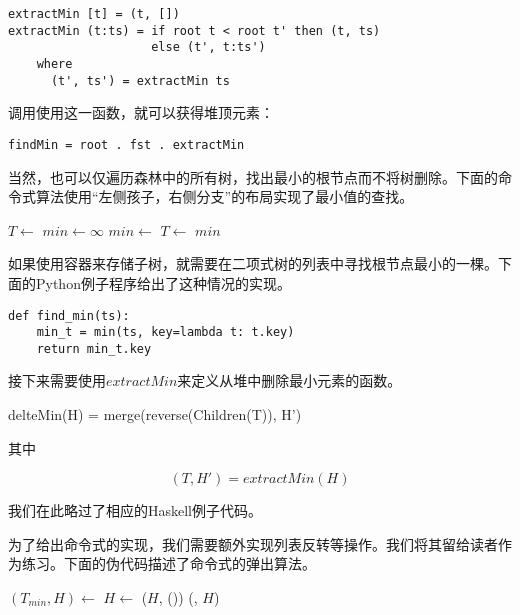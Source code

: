 \documentclass[UTF8]{article}
\begin{document}
\lstset{language=Haskell}
\begin{lstlisting}
extractMin [t] = (t, [])
extractMin (t:ts) = if root t < root t' then (t, ts)
                    else (t', t:ts')
    where
      (t', ts') = extractMin ts
\end{lstlisting}

调用使用这一函数，就可以获得堆顶元素：

\begin{lstlisting}
findMin = root . fst . extractMin
\end{lstlisting}

当然，也可以仅遍历森林中的所有树，找出最小的根节点而不将树删除。下面的命令式算法使用“左侧孩子，右侧分支”的布局实现了最小值的查找。

\begin{algorithmic}[1]
  \State $T \gets $ 
  \State $min \gets \infty$
      \State $min \gets $ 
    \EndIf
    \State $T \gets $ 
  \EndWhile
  \State \Return $min$
\EndFunction
\end{algorithmic}

如果使用容器来存储子树，就需要在二项式树的列表中寻找根节点最小的一棵。下面的Python例子程序给出了这种情况的实现。

\lstset{language=Python}
\begin{lstlisting}
def find_min(ts):
    min_t = min(ts, key=lambda t: t.key)
    return min_t.key
\end{lstlisting}

接下来需要使用$extractMin$来定义从堆中删除最小元素的函数。

\be
delteMin(H) = merge(reverse(Children(T)), H')
\ee

其中

\[
  (T, H') = extractMin(H)
\]

我们在此略过了相应的Haskell例子代码。

为了给出命令式的实现，我们需要额外实现列表反转等操作。我们将其留给读者作为练习。下面的伪代码描述了命令式的弹出算法。

\begin{algorithmic}[1]
  \State $(T_{min}, H) \gets$ 
  \State $H \gets$ ($H$, ())
  \State \Return (, $H$)
\EndFunction
\end{algorithmic}
\end{document}
